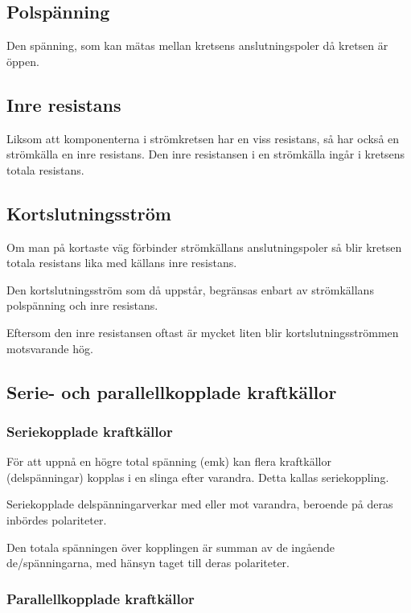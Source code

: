 \subsection{Polspänning}

Den spänning, som kan mätas mellan kretsens anslutningspoler då kretsen är öppen.

\subsection{Inre resistans}

Liksom att komponenterna i strömkretsen har en viss resistans, så har också en strömkälla
en inre resistans. Den inre resistansen i en strömkälla ingår i kretsens totala resistans.

\subsection{Kortslutningsström}

Om man på kortaste väg förbinder strömkällans anslutningspoler så blir kretsen totala
resistans lika med källans inre resistans.

Den kortslutningsström som då uppstår, begränsas enbart av strömkällans polspänning och
inre resistans.

Eftersom den inre resistansen oftast är mycket liten blir kortslutningsströmmen
motsvarande hög.

\subsection{Serie- och parallellkopplade kraftkällor}

\subsubsection{Seriekopplade kraftkällor}

För att uppnå en högre total spänning (emk)
kan flera kraftkällor (delspänningar) kopplas
i en slinga efter varandra. Detta kallas seriekoppling.

Seriekopplade delspänningarverkar med
eller mot varandra, beroende på deras
inbördes polariteter.

Den totala spänningen över kopplingen
är summan av de ingående de/spänningarna, med hänsyn taget till deras
polariteter.

\subsubsection{Parallellkopplade kraftkällor}

